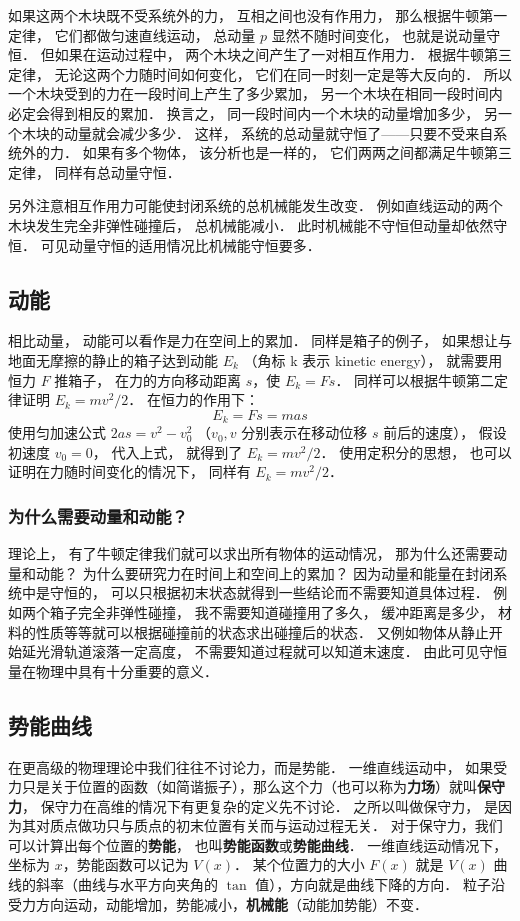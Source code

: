 如果这两个木块既不受系统外的力， 互相之间也没有作用力， 那么根据牛顿第一定律， 它们都做匀速直线运动， 总动量 $p$ 显然不随时间变化， 也就是说动量守恒． 但如果在运动过程中， 两个木块之间产生了一对相互作用力． 根据牛顿第三定律， 无论这两个力随时间如何变化， 它们在同一时刻一定是等大反向的． 所以一个木块受到的力在一段时间上产生了多少累加， 另一个木块在相同一段时间内必定会得到相反的累加． 换言之， 同一段时间内一个木块的动量增加多少， 另一个木块的动量就会减少多少． 这样， 系统的总动量就守恒了——只要不受来自系统外的力． 如果有多个物体， 该分析也是一样的， 它们两两之间都满足牛顿第三定律， 同样有总动量守恒．

另外注意相互作用力可能使封闭系统的总机械能发生改变． 例如直线运动的两个木块发生完全非弹性碰撞后， 总机械能减小． 此时机械能不守恒但动量却依然守恒． 可见动量守恒的适用情况比机械能守恒要多．

\subsection{动能}
相比动量， 动能可以看作是力在空间上的累加． 同样是箱子的例子， 如果想让与地面无摩擦的静止的箱子达到动能 $E_k$ （角标 k 表示 kinetic energy）， 就需要用恒力 $F$ 推箱子， 在力的方向移动距离 $s$，使 $E_k = Fs$． 同样可以根据牛顿第二定律证明 $E_k = mv^2/2$． 在恒力的作用下：
\begin{equation}
E_k = Fs = mas
\end{equation}
使用匀加速公式 $2as = v^2 - v_0^2$ （$v_0, v$ 分别表示在移动位移 $s$ 前后的速度）， 假设初速度 $v_0 = 0$， 代入上式， 就得到了 $E_k = mv^2/2$． 使用定积分的思想， 也可以证明在力随时间变化的情况下， 同样有 $E_k = mv^2/2$．

\subsubsection{为什么需要动量和动能？}
理论上， 有了牛顿定律我们就可以求出所有物体的运动情况， 那为什么还需要动量和动能？ 为什么要研究力在时间上和空间上的累加？ 因为动量和能量在封闭系统中是守恒的， 可以只根据初末状态就得到一些结论而不需要知道具体过程． 例如两个箱子完全非弹性碰撞， 我不需要知道碰撞用了多久， 缓冲距离是多少， 材料的性质等等就可以根据碰撞前的状态求出碰撞后的状态． 又例如物体从静止开始延光滑轨道滚落一定高度， 不需要知道过程就可以知道末速度． 由此可见守恒量在物理中具有十分重要的意义．

\subsection{势能曲线}
在更高级的物理理论中我们往往不讨论力，而是势能． 一维直线运动中， 如果受力只是关于位置的函数（如简谐振子），那么这个力（也可以称为\textbf{力场}）就叫\textbf{保守力}， 保守力在高维的情况下有更复杂的定义先不讨论． 之所以叫做保守力， 是因为其对质点做功只与质点的初末位置有关而与运动过程无关． 对于保守力，我们可以计算出每个位置的\textbf{势能}， 也叫\textbf{势能函数}或\textbf{势能曲线}． 一维直线运动情况下，坐标为 $x$，势能函数可以记为 $V(x)$． 某个位置力的大小 $F(x)$ 就是 $V(x)$ 曲线的斜率（曲线与水平方向夹角的 $\tan$ 值），方向就是曲线下降的方向． 粒子沿受力方向运动，动能增加，势能减小，\textbf{机械能}（动能加势能）不变．

